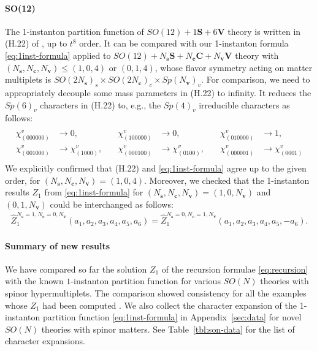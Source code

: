 \documentclass[letterpaper, 11pt]{article}
\begin{document}
{\paragraph{SO(12)}

The 1-instanton partition function of $SO(12) + 1\mathbf{S} + 6\mathbf{V}$ theory  is written in (H.22) of \cite{DelZotto:2018tcj}, up to $t^8$ order. It can be compared with our 1-instanton formula \eqref{eq:1inst-formula} applied to $SO(12) + N_\mathbf{s}\mathbf{S} + N_\mathbf{c}\mathbf{C} + N_\mathbf{v}\mathbf{V}$ theory with $(N_\mathbf{s},N_\mathbf{c}, N_{\mathbf{v}}) \leq (1,0,4)$ or $(0,1,4)$, whose flavor symmetry acting on matter multiplets is $SO(2N_\mathbf{s})_s \times SO(2N_\mathbf{c})_c \times Sp(N_\mathbf{v})_v$. For comparison, we need to appropriately decouple some mass parameters in (H.22) to infinity. It reduces the $Sp(6)_v$ characters in (H.22) to, e.g., the $Sp(4)_v$ irreducible characters as follows:
\begin{align}
\begin{split}
\begin{array}{llllll}
  \chi^{v}_{(000000)} &\rightarrow 0, & \quad \chi^{v}_{(100000)}&\rightarrow 0,& \quad \chi^{v}_{(010000)}&\rightarrow 1, \\ \chi^{v}_{(001000)}&\rightarrow \chi^{v}_{(1000)}, & \quad  \chi^{v}_{(000100)}&\rightarrow \chi^{v}_{(0100)}, & \quad \chi^{v}_{(000001)}&\rightarrow \chi^{v}_{(0001)}
\end{array}
\end{split}
\end{align}
We explicitly confirmed that (H.22) and \eqref{eq:1inst-formula} agree up to the given order, for $(N_\mathbf{s},N_\mathbf{c}, N_{\mathbf{v}}) = (1,0,4)$. Moreover, we checked that the 1-instanton results ${Z}_1$ from \eqref{eq:1inst-formula} for $(N_\mathbf{s},N_\mathbf{c}, N_{\mathbf{v}})= (1,0,N_\mathbf{v})$ and $(0,1,N_\mathbf{v})$ could be interchanged as follows: 
\begin{align}
  \hat{Z}_{1}^{N_{\mathbf{s}}=1,N_\mathbf{c}=0,N_{\mathbf{v}}}(a_1,a_2,a_3,a_4,a_5,a_6) = \hat{Z}_{1}^{N_{\mathbf{s}}=0,N_\mathbf{c}=1,N_{\mathbf{v}}}(a_1,a_2,a_3,a_4,a_5,-a_6).
\end{align}


\paragraph{Summary of new results}
We have compared so far the solution $Z_1$ of the recursion formulae \eqref{eq:recursion} with the known $1$-instanton partition function for various $SO(N)$ theories with spinor hypermultiplets. The comparison showed consistency for all the examples whose $Z_1$ had been computed \cite{Kim:2018gjo,DelZotto:2018tcj}. We also collect the character expansion of the 1-instanton partition function \eqref{eq:1inst-formula} in Appendix~\ref{sec:data} for novel $SO(N)$ theories with spinor matters. See Table~\ref{tbl:son-data} for the list of character expansions.


}
\end{document}
